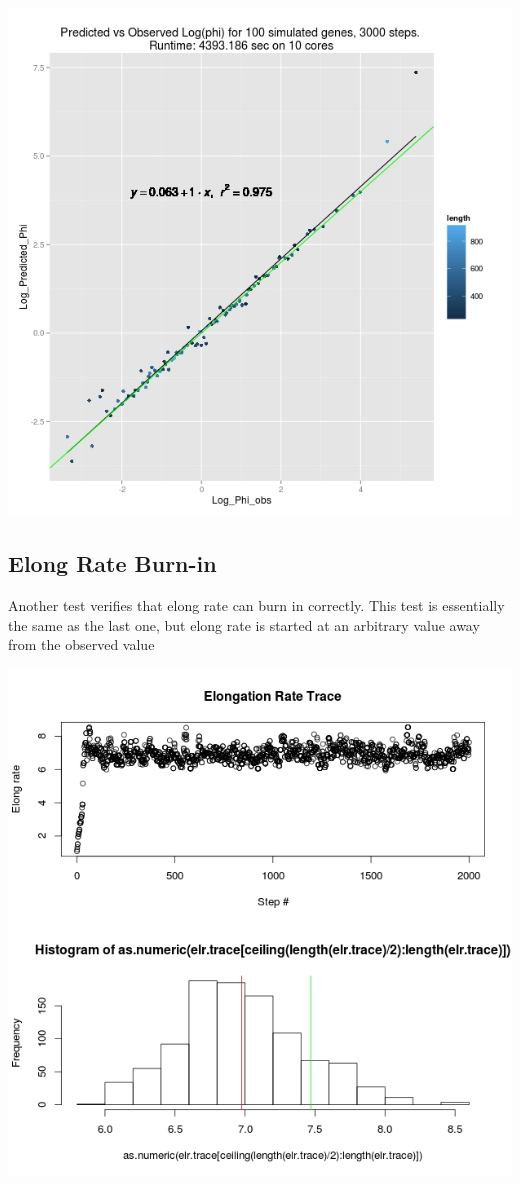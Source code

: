 \documentclass{article}
\begin{document}
 	\includegraphics[scale=0.4]{../chosen_100/genome_parms/elr_test_wo_phi/Rplot01.jpeg}
	
	\subsection{Elong Rate Burn-in}	
	 	
 	Another test verifies that elong rate can burn in correctly. This test is essentially the same as the last one, but elong rate is started at an arbitrary value away from the observed value
 	
	\includegraphics[scale=0.4]{../chosen_100/genome_parms/elr_test_wo_phi_init_elr/Rplot.jpeg}
 	
\end{document}
